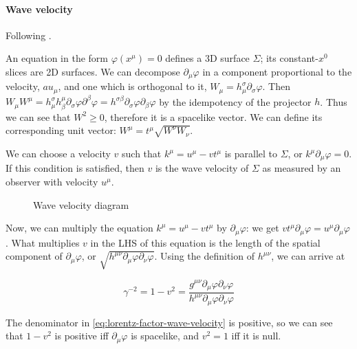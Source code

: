 \documentclass[main.tex]{subfiles}
\begin{document}
\paragraph{Wave velocity}

Following \cite[section 5]{Taub:1978}.

An equation in the form \(\varphi (x^\mu) = 0\) defines a 3D surface \(\Sigma\); its constant-\(x^0\) slices are 2D surfaces. We can decompose \(\partial_\mu \varphi\) in a component proportional to the velocity, \(a u_\mu\), and one which is orthogonal to it, \(W_\mu = h^\sigma_\mu \partial_\sigma \varphi\). Then \(W_\mu W^\mu = h^\sigma_\mu  h_\beta^\mu \partial_\sigma \varphi \partial^\beta \varphi = h^{\sigma\beta} \partial_\sigma \varphi \partial_\beta \varphi\)
by the idempotency of the projector \(h\).
Thus we can see that \(W^2 \geq 0\), therefore it is a spacelike vector. We can define its corresponding unit vector: \(W^\mu = t^\mu \sqrt{W^\nu W_\nu}\).

We can choose a velocity \(v\) such that \(k^\mu = u^\mu - v t^\mu\) is parallel to \(\Sigma\), or \(k^\mu \partial_\mu \varphi = 0\). If this condition is satisfied, then \(v\) is the wave velocity of \(\Sigma\) as measured by an observer with velocity \(u^\mu\).

\begin{figure}[ht]
  \centering
  \caption{Wave velocity diagram}
  \label{fig:taub_wave_velocity}
\end{figure}

Now, we can multiply the equation \(k^\mu = u^\mu - v t^\mu\) by \(\partial_\mu \varphi\): we get \(v t^\mu \partial_\mu \varphi = u^\mu \partial_\mu \varphi\). What multiplies \(v\) in the LHS of this equation is the length of the spatial component of \(\partial_\mu \varphi\), or \(\sqrt{h^{\mu\nu} \partial_\mu \varphi \partial_\nu \varphi}\).
Using the definition of \(h ^{\mu \nu} \), we can arrive at

\begin{equation} \label{eq:lorentz-factor-wave-velocity}
    \gamma^{-2} = 1 - v^2 = \frac{g^{\mu\nu} \partial_\mu \varphi \partial_\nu \varphi}{h^{\mu\nu} \partial_\mu \varphi \partial_\nu \varphi}
\end{equation}

The denominator in \eqref{eq:lorentz-factor-wave-velocity} is positive, so we can see that \(1-v^2\) is positive iff \(\partial_\mu \varphi\) is spacelike, and \(v^2 = 1\) iff it is null.
\end{document}
